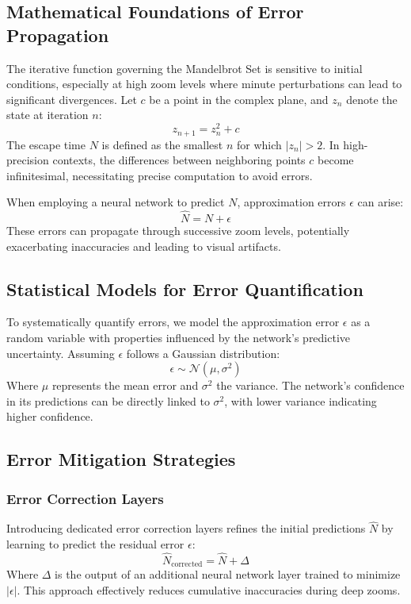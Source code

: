 \documentclass[journal]{IEEEaccess}
\begin{document}
\subsection{Mathematical Foundations of Error Propagation}
The iterative function governing the Mandelbrot Set is sensitive to initial conditions, especially at high zoom levels where minute perturbations can lead to significant divergences. Let \( c \) be a point in the complex plane, and \( z_n \) denote the state at iteration \( n \):
\begin{equation}
    z_{n+1} = z_n^2 + c
\end{equation}
The escape time \( N \) is defined as the smallest \( n \) for which \(|z_n| > 2\). In high-precision contexts, the differences between neighboring points \( c \) become infinitesimal, necessitating precise computation to avoid errors.

When employing a neural network to predict \( N \), approximation errors \( \epsilon \) can arise:
\begin{equation}
    \hat{N} = N + \epsilon
\end{equation}
These errors can propagate through successive zoom levels, potentially exacerbating inaccuracies and leading to visual artifacts.

\subsection{Statistical Models for Error Quantification}
To systematically quantify errors, we model the approximation error \( \epsilon \) as a random variable with properties influenced by the network's predictive uncertainty. Assuming \( \epsilon \) follows a Gaussian distribution:
\begin{equation}
    \epsilon \sim \mathcal{N}(\mu, \sigma^2)
\end{equation}
Where \( \mu \) represents the mean error and \( \sigma^2 \) the variance. The network's confidence in its predictions can be directly linked to \( \sigma^2 \), with lower variance indicating higher confidence.

\subsection{Error Mitigation Strategies}
\subsubsection{Error Correction Layers}
Introducing dedicated error correction layers refines the initial predictions \( \hat{N} \) by learning to predict the residual error \( \epsilon \):
\begin{equation}
    \hat{N}_{\text{corrected}} = \hat{N} + \Delta
\end{equation}
Where \( \Delta \) is the output of an additional neural network layer trained to minimize \( |\epsilon| \). This approach effectively reduces cumulative inaccuracies during deep zooms.
\end{document}
